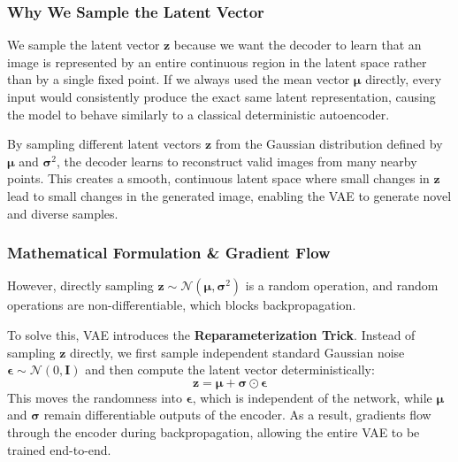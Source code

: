 \subsubsection*{Why We Sample the Latent Vector}
We sample the latent vector $\mathbf{z}$ because we want the decoder to learn that an image is represented by an entire continuous region in the latent space rather than by a single fixed point. If we always used the mean vector $\boldsymbol{\mu}$ directly, every input would consistently produce the exact same latent representation, causing the model to behave similarly to a classical deterministic autoencoder.

By sampling different latent vectors $\mathbf{z}$ from the Gaussian distribution defined by $\boldsymbol{\mu}$ and $\boldsymbol{\sigma}^2$, the decoder learns to reconstruct valid images from many nearby points. This creates a smooth, continuous latent space where small changes in $\mathbf{z}$ lead to small changes in the generated image, enabling the VAE to generate novel and diverse samples.

\subsubsection*{Mathematical Formulation \& Gradient Flow}
However, directly sampling $\mathbf{z} \sim \mathcal{N}(\boldsymbol{\mu}, \boldsymbol{\sigma}^2)$ is a random operation, and random operations are non-differentiable, which blocks backpropagation. 

To solve this, VAE introduces the \textbf{Reparameterization Trick}. Instead of sampling $\mathbf{z}$ directly, we first sample independent standard Gaussian noise $\boldsymbol{\epsilon} \sim \mathcal{N}(0, \mathbf{I})$ and then compute the latent vector deterministically:
\[
\mathbf{z} = \boldsymbol{\mu} + \boldsymbol{\sigma} \odot \boldsymbol{\epsilon}
\]
This moves the randomness into $\boldsymbol{\epsilon}$, which is independent of the network, while $\boldsymbol{\mu}$ and $\boldsymbol{\sigma}$ remain differentiable outputs of the encoder. As a result, gradients flow through the encoder during backpropagation, allowing the entire VAE to be trained end-to-end.

